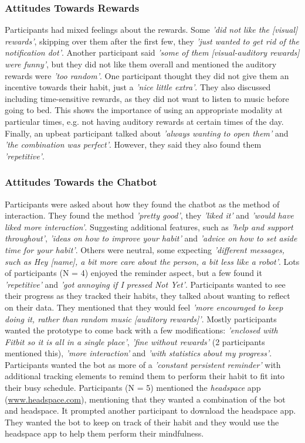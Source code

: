 \subsubsection*{Attitudes Towards Rewards}
Participants had mixed feelings about the rewards. Some \textit{'did not like the [visual] rewards'}, skipping over them after the first few, they \textit{'just wanted to get rid of the notification dot'}. Another participant said \textit{'some of them [visual-auditory rewards] were funny'}, but they did not like them overall and mentioned the auditory rewards were \textit{'too random'}. One participant thought they did not give them an incentive towards their habit, just a \textit{'nice little extra'}. They also discussed including time-sensitive rewards, as they did not want to listen to music before going to bed. This shows the importance of using an appropriate modality at particular times, e.g. not having auditory rewards at certain times of the day. Finally, an upbeat participant talked about \textit{'always wanting to open them'} and \textit{'the combination was perfect'}. However, they said they also found them \textit{'repetitive'}.

\subsubsection*{Attitudes Towards the Chatbot}
Participants were asked about how they found the chatbot as the method of interaction. They found the method \textit{'pretty good'}, they \textit{'liked it'} and \textit{'would have liked more interaction'}. Suggesting additional features, such as \textit{'help and support throughout'}, \textit{'ideas on how to improve your habit'} and \textit{'advice on how to set aside time for your habit'}. Others were neutral, some expecting \textit{'different messages, such as Hey [name], a bit more care about the person, a bit less like a robot'}. Lots of participants (N = 4) enjoyed the reminder aspect, but a few found it \textit{'repetitive'} and \textit{'got annoying if I pressed Not Yet'}. Participants wanted to see their progress as they tracked their habits, they talked about wanting to reflect on their data. They mentioned that they would feel \textit{'more encouraged to keep doing it, rather than random music [auditory rewards]'}. Mostly participants wanted the prototype to come back with a few modifications: \textit{'enclosed with Fitbit so it is all in a single place'}, \textit{'fine without rewards'} (2 participants mentioned this), \textit{'more interaction'} and \textit{'with statistics about my progress'}. Participants wanted the bot as more of a \textit{'constant persistent reminder'} with additional tracking elements to remind them to perform their habit to fit into their busy schedule. Participants (N = 5) mentioned the \textit{headspace} app (\url{www.headspace.com}), mentioning that they wanted a combination of the bot and headspace. It prompted another participant to download the headspace app. They wanted the bot to keep on track of their habit and they would use the headspace app to help them perform their mindfulness.


